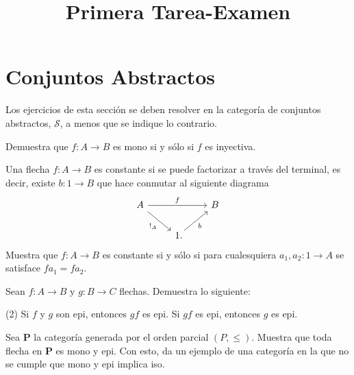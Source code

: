 \documentclass[10pt]{article}
\title{Primera Tarea-Examen}
\author{}
\date{}
\newcommand{\topos}[1]{\mathscr{#1}}
\newcommand{\cat}[1]{\mathbf{#1}}
\begin{document}
    \maketitle

    \section*{Conjuntos Abstractos}
    Los ejercicios de esta sección se deben resolver en la categoría de
    conjuntos abstractos, \(\topos{S}\), a menos que se indique lo contrario.

    \begin{exercise}
        Demuestra que \(f\colon A\to B\) es mono si y sólo si \(f\) es 
        inyectiva.
    \end{exercise}

    \begin{exercise}
        Una flecha \(f\colon A\to B\) es constante si se puede factorizar a
        través del terminal, es decir, existe \(b\colon 1\to B\) que hace
        conmutar al siguiente diagrama
        \begin{equation*}
            \begin{tikzcd}[ampersand replacement=\&] 
                A\ar{rr}{f}\ar{dr}[swap]{!_A} \&\& B\\
                \& 1\mathrlap{.}\ar{ur}[swap]{b}
            \end{tikzcd}
        \end{equation*}
        Muestra que \(f\colon A\to B\) es constante si y sólo si para
        cualesquiera \(a_1,a_2\colon 1\to A\) se satisface \(fa_1 = fa_2\).
    \end{exercise}

    \begin{exercise}
        Sean \(f\colon A\to B\) y \(g\colon B\to C\) flechas. Demuestra lo
        siguiente:
        \begin{tasks}(2)
            \task Si \(f\) y \(g\) son epi, entonces \(gf\) es epi.
            \task Si \(gf\) es epi, entonces \(g\) es epi.
        \end{tasks}
    \end{exercise}

    \begin{exercise}
        Sea \(\cat{P}\) la categoría generada por el orden parcial \((P,\leq)\).
        Muestra que toda flecha en \(\cat{P}\) es mono y epi. Con esto, da un
        ejemplo de una categoría en la que no se cumple que mono y epi implica iso.
    \end{exercise}
\end{document}
